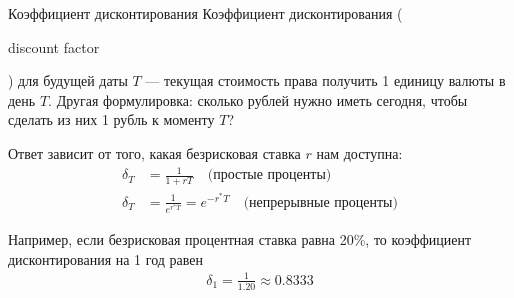 \documentclass{beamer}
\newcommand{\en}[1]{\begin{otherlanguage}{english}#1\end{otherlanguage}}
\begin{document}
\begin{frame}{Коэффициент дисконтирования}
\justify
\alert{Коэффициент дисконтирования} (\en{discount factor}) для будущей даты $T$ --- текущая стоимость права получить 1 единицу валюты в день $T$. Другая формулировка: сколько рублей нужно иметь сегодня, чтобы сделать из них 1 рубль к моменту $T$?

\justify
Ответ зависит от того, какая безрисковая ставка $r$ нам доступна:
\begin{align*}
\delta_T &= \frac{1}{1 + rT} \quad \text{(простые проценты)} \\
\delta_T &= \frac{1}{e^{r^*T}} = e^{-r^*T} \quad \text{(непрерывные проценты)}
\end{align*}

\justify
Например, если безрисковая процентная ставка равна 20\%, то коэффициент дисконтирования на 1 год равен
\begin{align*}
\delta_1 = \frac{1}{1.20} \approx 0.8333
\end{align*}
\end{frame}
\end{document}
